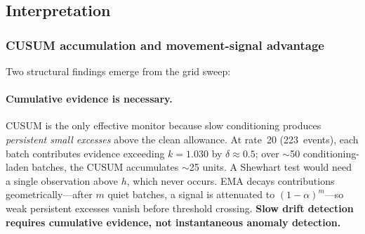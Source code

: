 \documentclass[10pt,twocolumn]{article}
\begin{document}
\begin{table}[htbp]
\centering
\caption{Formula-by-monitor comparison with optimised weights on the
4~grid-search rates (1, 4, 20, 100).  Rate coverage reported under the
zero-clean-alert constraint.  A checkmark indicates detection at that
rate; a cross indicates no detection.  The winning configuration
(max + CUSUM) was further evaluated across all 12~rates in
Table~\ref{tab:primary}.}
\label{tab:formula-monitor}
\end{table}

\subsection{Interpretation}
\label{sec:interpretation}

\subsubsection{CUSUM accumulation and movement-signal advantage}

Two structural findings emerge from the grid sweep:

\paragraph{Cumulative evidence is necessary.}  CUSUM is the only
effective monitor because slow conditioning produces \emph{persistent
small excesses} above the clean allowance.  At rate~20 (223~events),
each batch contributes evidence exceeding $k=1.030$ by
$\delta\approx0.5$; over $\sim$50 conditioning-laden batches, the CUSUM
accumulates $\sim$25 units.  A Shewhart test would need a single
observation above $h$, which never occurs.  EMA decays contributions
geometrically---after $m$ quiet batches, a signal is attenuated to
$(1{-}\alpha)^m$---so weak persistent excesses vanish before threshold
crossing.  \textbf{Slow drift detection requires cumulative evidence,
not instantaneous anomaly detection.}
\end{document}
